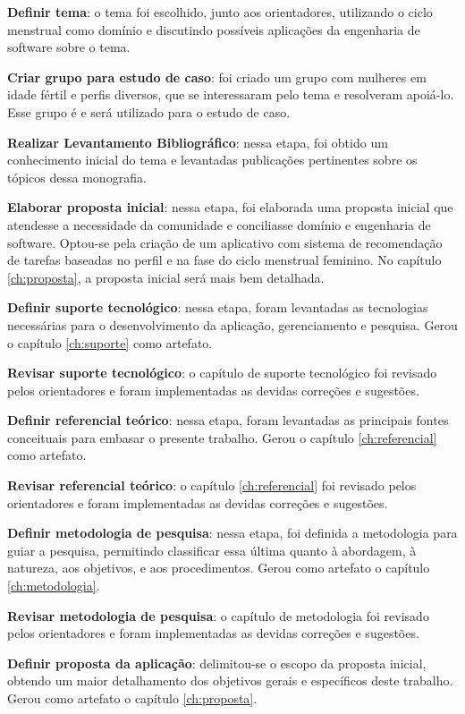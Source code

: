 \textbf{Definir tema}: o tema foi escolhido, junto aos orientadores, utilizando o ciclo menstrual como domínio e discutindo
possíveis aplicações da engenharia de software sobre o tema. 

\textbf{Criar grupo para estudo de caso}: foi criado um grupo com mulheres em idade fértil e perfis diversos, 
que se interessaram pelo tema e resolveram apoiá-lo. Esse grupo é e será utilizado 
para o estudo de caso.

\textbf{Realizar Levantamento Bibliográfico}: nessa etapa, foi obtido um conhecimento 
inicial do tema e levantadas publicações pertinentes sobre os tópicos dessa monografia. 

\textbf{Elaborar proposta inicial}: nessa etapa, foi elaborada uma proposta inicial que 
atendesse a necessidade da comunidade e conciliasse domínio e engenharia de software. 
Optou-se pela criação de um aplicativo com sistema de recomendação de tarefas baseadas no perfil e
na fase do ciclo menstrual feminino. No capítulo \ref{ch:proposta}, a proposta inicial será mais bem detalhada.

\textbf{Definir suporte tecnológico}: nessa etapa, foram levantadas as tecnologias necessárias para o desenvolvimento da aplicação, 
gerenciamento e pesquisa. Gerou o capítulo \ref{ch:suporte} como artefato.

\textbf{Revisar suporte tecnológico}: o capítulo de suporte tecnológico foi revisado pelos orientadores e foram implementadas as devidas correções e sugestões.

\textbf{Definir referencial teórico}: nessa etapa, foram levantadas as principais fontes conceituais para embasar o presente trabalho. Gerou o capítulo \ref{ch:referencial} como artefato.

\textbf{Revisar referencial teórico}: o capítulo \ref{ch:referencial} foi revisado pelos orientadores e foram implementadas as devidas correções e sugestões.

\textbf{Definir metodologia de pesquisa}: nessa etapa, foi definida a metodologia 
para guiar a pesquisa, permitindo classificar essa última quanto
à abordagem, à natureza, aos objetivos, e aos procedimentos. Gerou como artefato o capítulo \ref{ch:metodologia}.

\textbf{Revisar metodologia de pesquisa}: o capítulo de metodologia foi revisado pelos orientadores e foram implementadas as devidas correções e sugestões.

\textbf{Definir proposta da aplicação}: delimitou-se o escopo da proposta inicial, obtendo um maior detalhamento 
dos objetivos gerais e específicos deste trabalho. Gerou como artefato o capítulo \ref{ch:proposta}.

